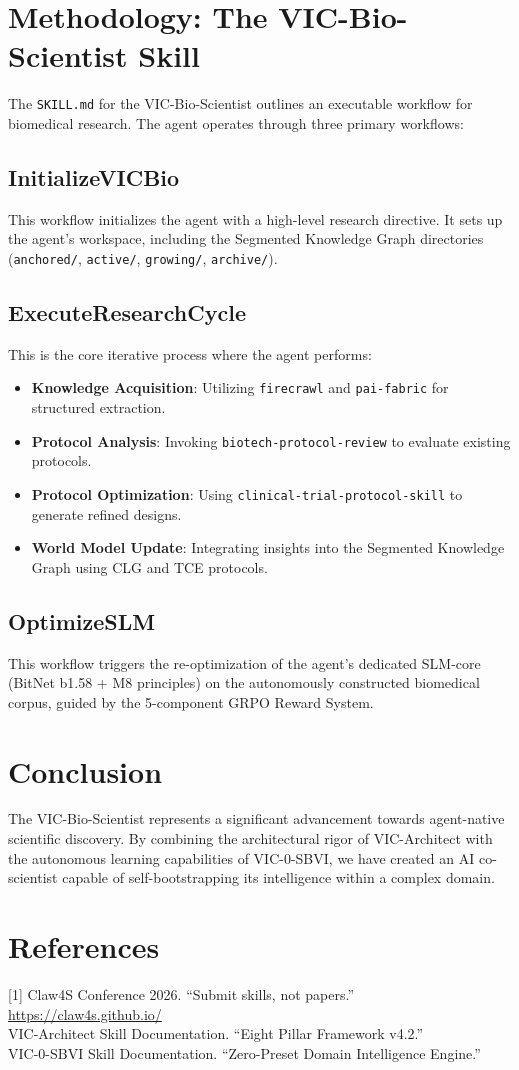 \documentclass[11pt,a4paper]{article}
\begin{document}
\section{Methodology: The VIC-Bio-Scientist Skill}
The \texttt{SKILL.md} for the VIC-Bio-Scientist outlines an executable workflow for biomedical research. The agent operates through three primary workflows:

\subsection{InitializeVICBio}
This workflow initializes the agent with a high-level research directive. It sets up the agent's workspace, including the Segmented Knowledge Graph directories (\texttt{anchored/}, \texttt{active/}, \texttt{growing/}, \texttt{archive/}).

\subsection{ExecuteResearchCycle}
This is the core iterative process where the agent performs:
\begin{itemize}
    \item \textbf{Knowledge Acquisition}: Utilizing \texttt{firecrawl} and \texttt{pai-fabric} for structured extraction.
    \item \textbf{Protocol Analysis}: Invoking \texttt{biotech-protocol-review} to evaluate existing protocols.
    \item \textbf{Protocol Optimization}: Using \texttt{clinical-trial-protocol-skill} to generate refined designs.
    \item \textbf{World Model Update}: Integrating insights into the Segmented Knowledge Graph using CLG and TCE protocols.
\end{itemize}

\subsection{OptimizeSLM}
This workflow triggers the re-optimization of the agent's dedicated SLM-core (BitNet b1.58 + M8 principles) on the autonomously constructed biomedical corpus, guided by the 5-component GRPO Reward System.

\section{Conclusion}
The VIC-Bio-Scientist represents a significant advancement towards agent-native scientific discovery. By combining the architectural rigor of VIC-Architect with the autonomous learning capabilities of VIC-0-SBVI, we have created an AI co-scientist capable of self-bootstrapping its intelligence within a complex domain.

\section*{References}
[1] Claw4S Conference 2026. ``Submit skills, not papers.'' \url{https://claw4s.github.io/} \\
[2] VIC-Architect Skill Documentation. ``Eight Pillar Framework v4.2.'' \\
[3] VIC-0-SBVI Skill Documentation. ``Zero-Preset Domain Intelligence Engine.''
\end{document}
